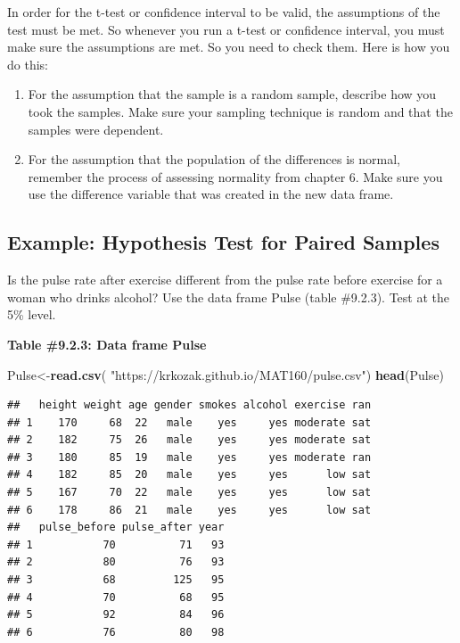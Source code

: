 \documentclass[
]{book}
\newenvironment{Shaded}{\begin{snugshade}}{\end{snugshade}}
\newcommand{\KeywordTok}[1]{\textcolor[rgb]{0.13,0.29,0.53}{\textbf{#1}}}
\newcommand{\NormalTok}[1]{#1}
\newcommand{\StringTok}[1]{\textcolor[rgb]{0.31,0.60,0.02}{#1}}
\begin{document}
In order for the t-test or confidence interval to be valid, the assumptions of the test must be met. So whenever you run a t-test or confidence interval, you must make sure the assumptions are met. So you need to check them. Here is how you do this:

\begin{enumerate}
\def\labelenumi{\arabic{enumi}.}
\item
  For the assumption that the sample is a random sample, describe how you took the samples. Make sure your sampling technique is random and that the samples were dependent.
\item
  For the assumption that the population of the differences is normal, remember the process of assessing normality from chapter 6. Make sure you use the difference variable that was created in the new data frame.
\end{enumerate}

\hypertarget{example-hypothesis-test-for-paired-samples}{%
\subsection{Example: Hypothesis Test for Paired Samples}\label{example-hypothesis-test-for-paired-samples}}

Is the pulse rate after exercise different from the pulse rate before exercise for a woman who drinks alcohol? Use the data frame Pulse (table \#9.2.3). Test at the 5\% level.

\textbf{Table \#9.2.3: Data frame Pulse}

\begin{Shaded}
\begin{Highlighting}[]
\NormalTok{Pulse<-}\KeywordTok{read.csv}\NormalTok{(}
  \StringTok{"https://krkozak.github.io/MAT160/pulse.csv"}\NormalTok{)}
\KeywordTok{head}\NormalTok{(Pulse)}
\end{Highlighting}
\end{Shaded}

\begin{verbatim}
##   height weight age gender smokes alcohol exercise ran
## 1    170     68  22   male    yes     yes moderate sat
## 2    182     75  26   male    yes     yes moderate sat
## 3    180     85  19   male    yes     yes moderate ran
## 4    182     85  20   male    yes     yes      low sat
## 5    167     70  22   male    yes     yes      low sat
## 6    178     86  21   male    yes     yes      low sat
##   pulse_before pulse_after year
## 1           70          71   93
## 2           80          76   93
## 3           68         125   95
## 4           70          68   95
## 5           92          84   96
## 6           76          80   98
\end{verbatim}
\end{document}
